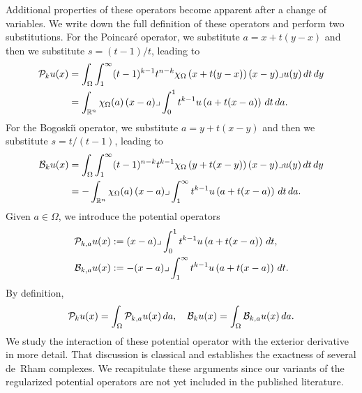 \documentclass[10pt,a4paper]{article}
\begin{document}
Additional properties of these operators become apparent after a change of variables. 
We write down the full definition of these operators and perform two substitutions.
For the Poincar\'e operator, we substitute $a = x + t(y-x)$ and then we substitute $s = (t-1)/t$,
leading to 
\begin{align*}
    {\mathcal P}_{k} u(x) 
    &= 
    \int_{\Omega} \int_{1}^\infty (t-1)^{k-1}t^{n-k} 
    \chi_{\Omega}\left(x+t(y-x)\right) 
    (x-y)\lrcorner u(y) \,dt\,dy 
    \\
    &=
    \int_{{\mathbb R}^{n}} \chi_{\Omega}(a) \,(x-a)\lrcorner \int_{0}^{1} t^{k-1} u\left(a+t(x-a)\right)\,dt\,da
    .
\end{align*}
For the Bogoski\u{\i} operator, we substitute $a = y + t(x-y)$ and then we substitute $s = t/(t-1)$,
leading to 
\begin{align*}
    {\mathcal B}_{k} u(x) 
    &= 
    \int_{\Omega} \int_{1}^\infty (t-1)^{n-k}t^{k-1} 
    \chi_{\Omega}\left(y+t(x-y)\right) 
    (x-y)\lrcorner u(y) \,dt\,dy 
    \\
    &=
    - \int_{{\mathbb R}^{n}} \chi_{\Omega}(a) \,(x-a)\lrcorner \int_{1}^\infty t^{k-1} u\left(a+t(x-a)\right)\,dt\,da
    .
\end{align*}
% 
Given $a \in \Omega$, we introduce the potential operators 
\begin{align*}
    {\mathcal P}_{k,a} u(x) 
    &:= 
    (x-a)\lrcorner \int_{0}^{1} t^{k-1} u\left(a+t(x-a)\right)\,dt
    ,
    \\
    {\mathcal B}_{k,a} u(x) 
    &:= 
    - (x-a)\lrcorner \int_{1}^\infty t^{k-1} u\left(a+t(x-a)\right)\,dt
    .
\end{align*}
By definition,
\begin{align*}
    {\mathcal P}_{k} u(x) 
    =
    \int_{\Omega} {\mathcal P}_{k,a} u(x) \,da,
    \quad 
    {\mathcal B}_{k} u(x) 
    =
    \int_{\Omega} {\mathcal B}_{k,a} u(x) \,da
    .
\end{align*}
We study the interaction of these potential operator with the exterior derivative in more detail.
% 
That discussion is classical and establishes the exactness of several de~Rham complexes. 
We recapitulate these arguments since our variants of the regularized potential operators 
are not yet included in the published literature. 
\end{document}
